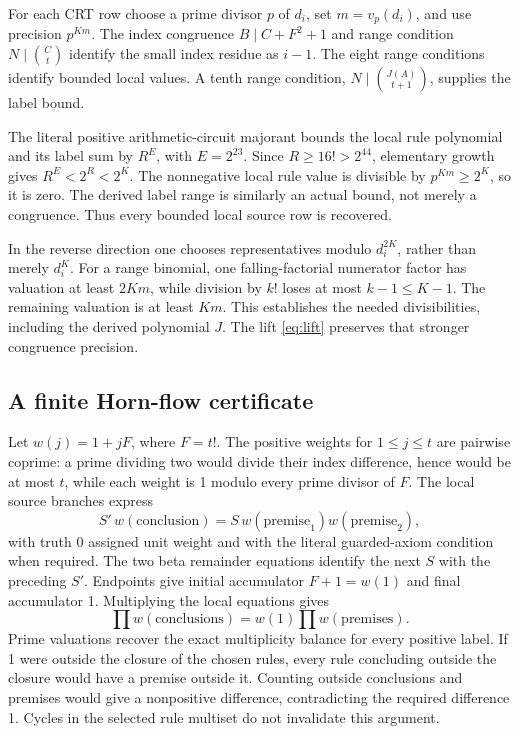 \documentclass[11pt,a4paper]{article}
\theoremstyle{remark}
\begin{document}
For each CRT row choose a prime divisor \(p\) of \(d_i\), set
\(m=v_p(d_i)\), and use precision \(p^{Km}\). The index congruence
\(B\mid C+F^2+1\) and range condition \(N\mid\binom Ct\) identify the
small index residue as \(i-1\). The eight range conditions identify
bounded local values. A tenth range condition,
\(N\mid\binom{J(A)}{t+1}\), supplies the label bound.

The literal positive arithmetic-circuit majorant bounds the local rule
polynomial and its label sum by \(R^E\), with \(E=2^{23}\). Since
\(R\ge16!>2^{44}\), elementary growth gives \(R^E<2^R<2^K\).
The nonnegative local rule value is divisible by \(p^{Km}\ge2^K\), so it
is zero. The derived label range is similarly an actual bound, not merely
a congruence. Thus every bounded local source row is recovered.

In the reverse direction one chooses representatives modulo
\(d_i^{2K}\), rather than merely \(d_i^K\). For a range binomial, one
falling-factorial numerator factor has valuation at least \(2Km\),
while division by \(k!\) loses at most \(k-1\le K-1\). The remaining
valuation is at least \(Km\). This establishes the needed divisibilities,
including the derived polynomial \(J\). The lift \eqref{eq:lift}
preserves that stronger congruence precision.

\subsection{A finite Horn-flow certificate}

Let \(w(j)=1+jF\), where \(F=t!\). The positive weights for
\(1\le j\le t\) are pairwise coprime: a prime dividing two would
divide their index difference, hence would be at most \(t\), while
each weight is 1 modulo every prime divisor of \(F\).
The local source branches express
\[
 S'\,w(\text{conclusion})
   =S\,w(\text{premise}_1)w(\text{premise}_2),
\]
with truth 0 assigned unit weight and with the literal guarded-axiom
condition when required. The two beta remainder equations identify the
next \(S\) with the preceding \(S'\). Endpoints give initial accumulator
\(F+1=w(1)\) and final accumulator 1. Multiplying the local equations gives
\[
 \prod w(\text{conclusions})
  =w(1)\prod w(\text{premises}).
\]
Prime valuations recover the exact multiplicity balance for every positive
label. If 1 were outside the closure of the chosen rules, every rule
concluding outside the closure would have a premise outside it. Counting
outside conclusions and premises would give a nonpositive difference,
contradicting the required difference 1. Cycles in the selected rule
multiset do not invalidate this argument.
\end{document}

